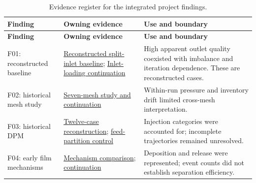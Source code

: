 \begin{longtable}{@{}>{\raggedright\arraybackslash}p{0.29000000\dimexpr\linewidth-4\tabcolsep\relax}>{\raggedright\arraybackslash}p{0.34000000\dimexpr\linewidth-4\tabcolsep\relax}>{\raggedright\arraybackslash}p{0.37000000\dimexpr\linewidth-4\tabcolsep\relax}@{}}
\caption{Evidence register for the integrated project findings.}\label{tab:table-A.1}\\
\toprule
\textbf{Finding} & \textbf{Owning evidence} & \textbf{Use and boundary} \\
\midrule
\endfirsthead
\toprule
\textbf{Finding} & \textbf{Owning evidence} & \textbf{Use and boundary} \\
\midrule
\endhead
F01: reconstructed baseline & \href{https://github.com/Shuhei-uni/P4P_knowledgeWiki/blob/main/Project/experiments/phase-02-parity-reset-and-pre-v2-qualification/purnanto-08b-parity-split-inlet/results.md}{Reconstructed split-inlet baseline}; \href{https://github.com/Shuhei-uni/P4P_knowledgeWiki/blob/main/Project/experiments/phase-02-parity-reset-and-pre-v2-qualification/purnanto-08c-inlet-loading-sensitivity/results.md}{Inlet-loading continuation} & High apparent outlet quality coexisted with imbalance and iteration dependence. These are reconstructed cases. \\
F02: historical mesh study & \href{https://github.com/Shuhei-uni/P4P_knowledgeWiki/blob/main/Project/experiments/phase-02-parity-reset-and-pre-v2-qualification/purnanto-08b-parity-split-inlet/mesh-convergence-checkpoint-20260803.md}{Seven-mesh study and continuation} & Within-run pressure and inventory drift limited cross-mesh interpretation. \\
F03: historical DPM & \href{https://github.com/Shuhei-uni/P4P_knowledgeWiki/blob/main/Project/experiments/phase-03-dpm-carryover-and-coupling/historical-andy-studies/enthalpy-dpm-replication.md}{Twelve-case reconstruction}; \href{https://github.com/Shuhei-uni/P4P_knowledgeWiki/blob/main/Project/experiments/phase-03-dpm-carryover-and-coupling/purnanto-09cV2-dpm-partition-control/results.md}{feed-partition control} & Injection categories were accounted for; incomplete trajectories remained unresolved. \\
F04: early film mechanisms & \href{https://github.com/Shuhei-uni/P4P_knowledgeWiki/blob/main/Project/experiments/phase-04-ewf-wall-film-mechanisms/observations/04-010v2-ewf-mechanism-comparison.md}{Mechanism comparison}; \href{https://github.com/Shuhei-uni/P4P_knowledgeWiki/blob/main/Project/experiments/phase-04-ewf-wall-film-mechanisms/observations/06-010v2-iteration-continuation.md}{continuation} & Deposition and release were represented; event counts did not establish separation efficiency. \\

\end{longtable}
